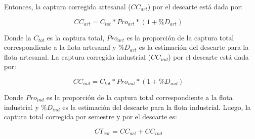 \documentclass[letter,11pt]{article}
\begin{document}
Entonces, la captura corregida artesanal (\(CC_{art}\)) por el descarte
est\'a dada por:

\begin{equation}
CC_{art}=C_{tot}*Pro_{art}*(1+\%D_{art})
\end{equation}

Donde la $C_{tot}$ es la captura total, $Pro_{art}$ es la proporci\'on
de la captura total correspondiente a la flota artesanal y $\%D_{art}$
es la estimaci\'on del descarte para la flota artesanal. La captura
corregida industrial ($CC_{ind}$) por el descarte est\'a dada por:

\begin{equation}
CC_{ind}=C_{tot}*Pro_{ind}*(1+\%D_{ind})
\end{equation}

Donde $Pro_{ind}$ es la proporci\'on de la captura total correspondiente
a la flota industrial y $\%D_{ind}$ es la estimaci\'on del descarte para
la flota industrial. Luego, la captura total corregida por semestre y
por el descarte es:

\begin{equation}
CT_{cor}=CC_{art}+CC_{ind}
\end{equation}
\end{document}
